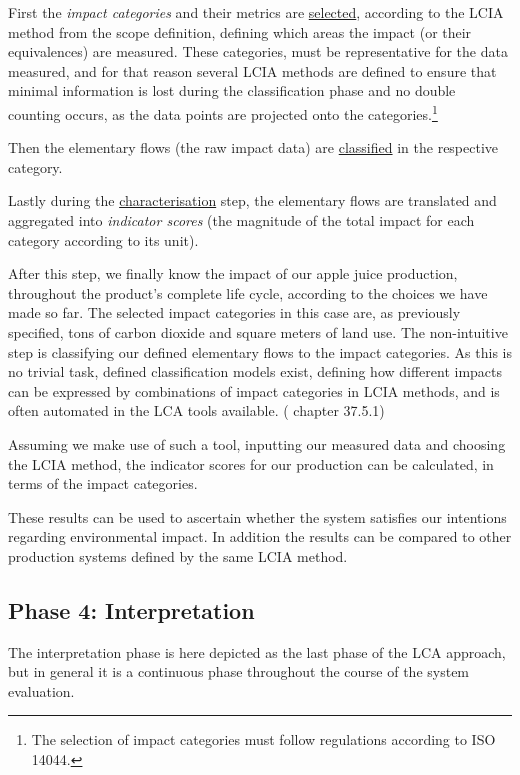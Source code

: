 First the \emph{impact categories} and their metrics are \underline{selected}, according to the LCIA method from the scope definition, defining which areas the impact (or their equivalences) are measured. These categories, must be representative for the data measured, and for that reason several LCIA methods are defined to ensure that minimal information is lost during the classification phase and no double counting occurs, as the data points are projected onto the categories.\footnote{The selection of impact categories must follow regulations according to ISO 14044.}

Then the elementary flows (the raw impact data) are \underline{classified} in the respective category.

Lastly during the \underline{characterisation} step, the elementary flows are translated and aggregated into \emph{indicator scores} (the magnitude of the total impact for each category according to its unit).

After this step, we finally know the impact of our apple juice production, throughout the product's complete life cycle, according to the choices we have made so far. The selected impact categories in this case are, as previously specified, tons of carbon dioxide and square meters of land use. The non-intuitive step is classifying our defined elementary flows to the impact categories. As this is no trivial task, defined classification models exist, defining how different impacts can be expressed by combinations of impact categories in LCIA methods, and is often automated in the LCA tools available. (\cite{LCA_TheoryAndPractice} chapter 37.5.1)

Assuming we make use of such a tool, inputting our measured data and choosing the LCIA method, the indicator scores for our production can be calculated, in terms of the impact categories. 

These results can be used to ascertain whether the system satisfies our intentions regarding environmental impact. In addition the results can be compared to other production systems defined by the same LCIA method.

\subsection{Phase 4: Interpretation} \label{ssec:Phase4}
The interpretation phase is here depicted as the last phase of the LCA approach, but in general it is a continuous phase throughout the course of the system evaluation.

